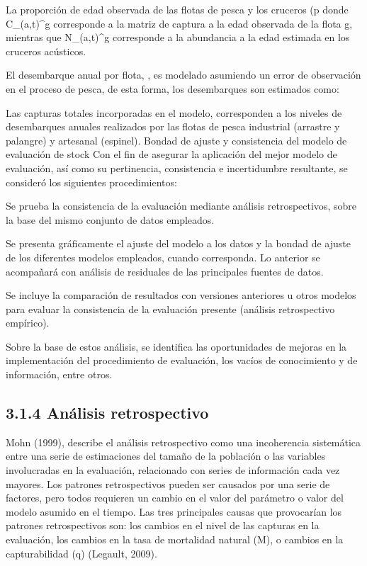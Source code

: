 \documentclass[
  spanish,
]{article}
\begin{document}
La proporción de edad observada de las flotas de pesca y los cruceros (p
donde C\_(a,t)\^{}g corresponde a la matriz de captura a la edad
observada de la flota g, mientras que N\_(a,t)\^{}g corresponde a la
abundancia a la edad estimada en los cruceros acústicos.

El desembarque anual por flota, , es modelado asumiendo un error de
observación en el proceso de pesca, de esta forma, los desembarques son
estimados como:

Las capturas totales incorporadas en el modelo, corresponden a los
niveles de desembarques anuales realizados por las flotas de pesca
industrial (arrastre y palangre) y artesanal (espinel). Bondad de ajuste
y consistencia del modelo de evaluación de stock Con el fin de asegurar
la aplicación del mejor modelo de evaluación, así como su pertinencia,
consistencia e incertidumbre resultante, se consideró los siguientes
procedimientos:

Se prueba la consistencia de la evaluación mediante análisis
retrospectivos, sobre la base del mismo conjunto de datos empleados.

Se presenta gráficamente el ajuste del modelo a los datos y la bondad de
ajuste de los diferentes modelos empleados, cuando corresponda. Lo
anterior se acompañará con análisis de residuales de las principales
fuentes de datos.

Se incluye la comparación de resultados con versiones anteriores u otros
modelos para evaluar la consistencia de la evaluación presente (análisis
retrospectivo empírico).

Sobre la base de estos análisis, se identifica las oportunidades de
mejoras en la implementación del procedimiento de evaluación, los vacíos
de conocimiento y de información, entre otros.

\hypertarget{anuxe1lisis-retrospectivo}{%
\subsection{3.1.4 Análisis
retrospectivo}\label{anuxe1lisis-retrospectivo}}

Mohn (1999), describe el análisis retrospectivo como una incoherencia
sistemática entre una serie de estimaciones del tamaño de la población o
las variables involucradas en la evaluación, relacionado con series de
información cada vez mayores. Los patrones retrospectivos pueden ser
causados por una serie de factores, pero todos requieren un cambio en el
valor del parámetro o valor del modelo asumido en el tiempo. Las tres
principales causas que provocarían los patrones retrospectivos son: los
cambios en el nivel de las capturas en la evaluación, los cambios en la
tasa de mortalidad natural (M), o cambios en la capturabilidad (q)
(Legault, 2009).
\end{document}

